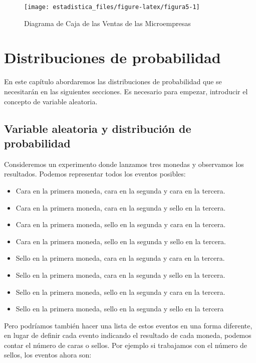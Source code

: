 \documentclass[]{book}
\providecommand{\tightlist}{%
  \setlength{\itemsep}{0pt}\setlength{\parskip}{0pt}}
\begin{document}
\begin{figure}[h!]

{\centering \texttt{[image: estadistica\_files/figure-latex/figura5-1]} 

}

\caption{Diagrama de Caja de las Ventas de las Microempresas}\label{fig:figura5}
\end{figure}

\hypertarget{distr}{%
\chapter{Distribuciones de probabilidad}\label{distr}}

En este capítulo abordaremos las distribuciones de probabilidad que se necesitarán en las siguientes secciones. Es necesario para empezar, introducir el concepto de variable aleatoria.

\hypertarget{variable-aleatoria-y-distribucion-de-probabilidad}{%
\section{Variable aleatoria y distribución de probabilidad}\label{variable-aleatoria-y-distribucion-de-probabilidad}}

Consideremos un experimento donde lanzamos tres monedas y observamos los resultados. Podemos representar todos los eventos posibles:

\begin{itemize}
\tightlist
\item
  Cara en la primera moneda, cara en la segunda y cara en la tercera.
\item
  Cara en la primera moneda, cara en la segunda y sello en la tercera.
\item
  Cara en la primera moneda, sello en la segunda y cara en la tercera.
\item
  Cara en la primera moneda, sello en la segunda y sello en la tercera.
\item
  Sello en la primera moneda, cara en la segunda y cara en la tercera.
\item
  Sello en la primera moneda, cara en la segunda y sello en la tercera.
\item
  Sello en la primera moneda, sello en la segunda y cara en la tercera.
\item
  Sello en la primera moneda, sello en la segunda y sello en la tercera
\end{itemize}

Pero podríamos también hacer una lista de estos eventos en una forma diferente, en lugar de definir cada evento indicando el resultado de cada moneda, podemos contar el número de caras o sellos. Por ejemplo si trabajamos con el número de sellos, los eventos ahora son:
\end{document}
